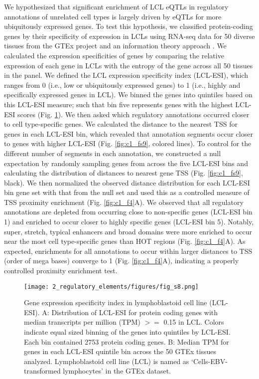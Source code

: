 We hypothesized that significant enrichment of LCL eQTLs in regulatory annotations of unrelated cell types is largely driven by eQTLs for more ubiquitously expressed genes. To test this hypothesis, we classified protein-coding genes by their specificity of expression in LCLs using RNA-seq data for 50 diverse tissues from the GTEx project \cite{gtexconsortiumGeneticEffectsGene2017} and an information theory approach \cite{schugPromoterFeaturesRelated2005, heGlobalViewEnhancer2014, scottGeneticRegulatorySignature2016, varshneyGeneticRegulatorySignatures2017}. We calculated the expression specificities of genes by comparing the relative expression of each gene in LCLs with the entropy of the gene across all 50 tissues in the panel. We defined the LCL expression specificity index (LCL-ESI), which ranges from 0 (i.e., low or ubiquitously expressed genes) to 1 (i.e., highly and specifically expressed genes in LCL). We binned the genes into quintiles based on this LCL-ESI measure; such that bin five represents genes with the highest LCL-ESI scores (Fig. \ref{fig:c1_fs8}). We then asked which regulatory annotations occurred closer to cell type-specific genes. We calculated the distance to the nearest TSS for genes in each LCL-ESI bin, which revealed that annotation segments occur closer to genes with higher LCL-ESI (Fig. \ref{fig:c1_fs9}, colored lines). To control for the different number of segments in each annotation, we constructed a null expectation by randomly sampling genes from across the five LCL-ESI bins and calculating the distribution of distances to nearest gene TSS (Fig. \ref{fig:c1_fs9}, black). We then normalized the observed distance distribution for each LCL-ESI bin gene set with that from the null set and used this as a controlled measure of TSS proximity enrichment (Fig. \ref{fig:c1_f4}A). We observed that all regulatory annotations are depleted from occurring close to non-specific genes (LCL-ESI bin 1) and enriched to occur closer to highly specific genes (LCL-ESI bin 5). Notably, super, stretch, typical enhancers and broad domains were more enriched to occur near the most cell type-specific genes than HOT regions (Fig. \ref{fig:c1_f4}A). As expected, enrichments for all annotations to occur within larger distances to TSS (order of mega bases) converge to 1 (Fig. \ref{fig:c1_f4}A), indicating a properly controlled proximity enrichment test. \\

\begin{figure}
    \centering
    \texttt{[image: 2\_regulatory\_elements/figures/fig\_s8.png]}
    \caption{Gene expression specificity index in lymphoblastoid cell line (LCL-ESI). A: Distribution of LCL-ESI for protein coding genes with median transcripts per million (TPM) $>=$ 0.15 in LCL. Colors indicate equal sized binning of the genes into quintiles by LCL-ESI. Each bin contained 2753 protein coding genes. B: Median TPM for genes in each LCL-ESI quintile bin across the 50 GTEx tissues analyzed. Lymphoblastoid cell line (LCL) is named as ‘Cells-EBV-transformed lymphocytes’ in the GTEx dataset.}
    \label{fig:c1_fs8}
\end{figure}

